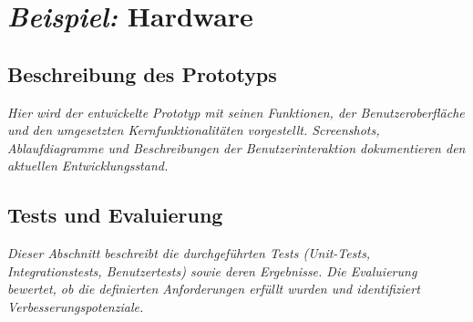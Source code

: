 
\section{\emph{Beispiel:} Hardware\authorA}



\subsection{Beschreibung des Prototyps}

\emph{Hier wird der entwickelte Prototyp mit seinen Funktionen, der Benutzeroberfläche und den umgesetzten Kernfunktionalitäten vorgestellt. Screenshots, Ablaufdiagramme und Beschreibungen der Benutzerinteraktion dokumentieren den aktuellen Entwicklungsstand.}



\subsection{Tests und Evaluierung}

\emph{Dieser Abschnitt beschreibt die durchgeführten Tests (Unit-Tests, Integrationstests, Benutzertests) sowie deren Ergebnisse. Die Evaluierung bewertet, ob die definierten Anforderungen erfüllt wurden und identifiziert Verbesserungspotenziale.}

